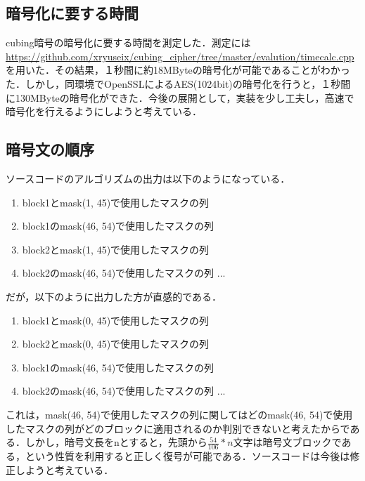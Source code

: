 \documentclass[titlepage]{jarticle}
\begin{document}
\subsection{暗号化に要する時間}
cubing暗号の暗号化に要する時間を測定した．測定には\url{https://github.com/xryuseix/cubing_cipher/tree/master/evalution/timecalc.cpp}を用いた．その結果，１秒間に約18MByteの暗号化が可能であることがわかった．しかし，同環境でOpenSSLによるAES(1024bit)の暗号化を行うと，１秒間に130MByteの暗号化ができた．今後の展開として，実装を少し工夫し，高速で暗号化を行えるようにしようと考えている．

\subsection{暗号文の順序}
ソースコードのアルゴリズムの出力は以下のようになっている．\\
\begin{screen}
  \begin{enumerate}
    \item block1とmask(1, 45)で使用したマスクの列
    \item block1のmask(46, 54)で使用したマスクの列
    \item block2とmask(1, 45)で使用したマスクの列
    \item block2のmask(46, 54)で使用したマスクの列 ...
  \end{enumerate}
\end{screen}
だが，以下のように出力した方が直感的である．\\
\begin{screen}
  \begin{enumerate}
    \item block1とmask(0, 45)で使用したマスクの列
    \item block2とmask(0, 45)で使用したマスクの列
    \item block1のmask(46, 54)で使用したマスクの列
    \item block2のmask(46, 54)で使用したマスクの列 ...
  \end{enumerate}
\end{screen}
これは，mask(46, 54)で使用したマスクの列に関してはどのmask(46, 54)で使用したマスクの列がどのブロックに適用されるのか判別できないと考えたからである．しかし，暗号文長をnとすると，先頭から\(\frac{54}{106}*n\)文字は暗号文ブロックである，という性質を利用すると正しく復号が可能である．ソースコードは今後は修正しようと考えている．
\end{document}
